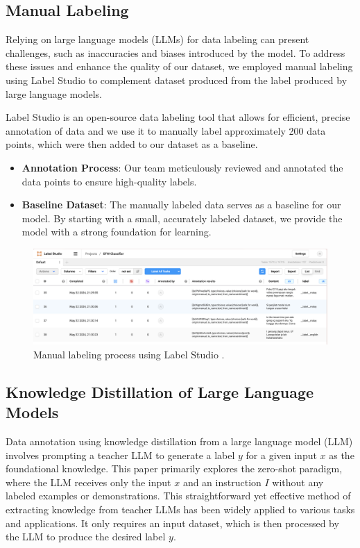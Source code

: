 \documentclass[preprint]{article}
\begin{document}
\subsection{Manual Labeling}
Relying on large language models (LLMs) for data labeling can present challenges, such as inaccuracies and biases introduced by the model. To address these issues and enhance the quality of our dataset, we employed manual labeling using Label Studio \cite{LabelStudio} to complement dataset produced from the label produced by large language models.

Label Studio \cite{LabelStudio} is an open-source data labeling tool that allows for efficient, precise annotation of data and we use it to manually label approximately 200 data points, which were then added to our dataset as a baseline.

\begin{itemize}
  \item \textbf{Annotation Process}: Our team meticulously reviewed and annotated the data points to ensure high-quality labels.
  \item \textbf{Baseline Dataset}: The manually labeled data serves as a baseline for our model. By starting with a small, accurately labeled dataset, we provide the model with a strong foundation for learning.
\end{itemize}

\begin{figure}[h]
  \centering
  \includegraphics[width=0.6\linewidth]{img/labelstudio.png}
  \caption{Manual labeling process using Label Studio \cite{LabelStudio}.}
\end{figure}

\subsection{Knowledge Distillation of Large Language Models}

Data annotation using knowledge distillation from a large language model (LLM) involves prompting a teacher LLM to generate a label \( y \) for a given input \( x \) as the foundational knowledge. This paper primarily explores the zero-shot paradigm, where the LLM receives only the input \( x \) and an instruction \( I \) without any labeled examples or demonstrations. This straightforward yet effective method of extracting knowledge from teacher LLMs has been widely applied to various tasks and applications. It only requires an input dataset, which is then processed by the LLM to produce the desired label \( y \).
\end{document}
